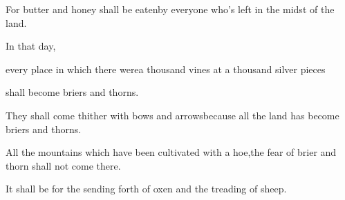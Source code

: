\begin{inparaenum}
  \pb For butter and honey shall be eaten\pa by everyone who's left in the midst of the land.%
  
  \pa {} In that day,%
  
  \pb every place in which there were\pa a thousand vines at a thousand silver pieces%
  
  \pb shall become briers and thorns.%
  
  \pa {} They shall come thither with bows and arrows\pa because all the land has become briers and thorns.%
  
  \pb {} All the mountains which have been cultivated with a hoe,\pa the fear of brier and thorn shall not come there.%
  
  \pb It shall be for the sending forth of oxen and the treading of sheep.%
\end{inparaenum}
